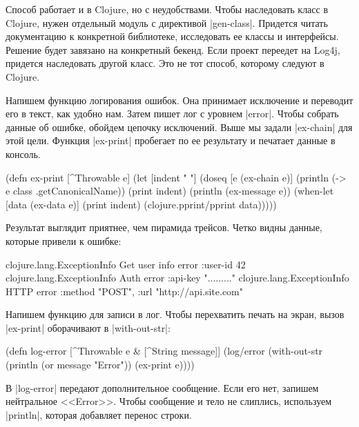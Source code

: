 Способ работает и в Clojure, но с неудобствами. Чтобы наследовать класс в
Clojure, нужен отдельный модуль с директивой \spverb|gen-class|. Придется читать
документацию к конкретной библиотеке, исследовать ее классы и
интерфейсы. Решение будет завязано на конкретный бекенд. Если проект переедет на
Log4j, придется наследовать другой класс. Это не тот способ, которому следуют в
Clojure.

Напишем функцию логирования ошибок. Она принимает исключение и переводит его в
текст, как удобно нам. Затем пишет лог с уровнем \spverb|error|. Чтобы собрать
данные об ошибке, обойдем цепочку исключений. Выше мы задали \spverb|ex-chain|
для этой цели. Функция \spverb|ex-print| пробегает по ее результату и печатает
данные в консоль.

\begin{english}
  \begin{clojure}
(defn ex-print
  [^Throwable e]
  (let [indent "  "]
    (doseq [e (ex-chain e)]
      (println (-> e class .getCanonicalName))
      (print indent)
      (println (ex-message e))
      (when-let [data (ex-data e)]
        (print indent)
        (clojure.pprint/pprint data)))))
  \end{clojure}
\end{english}

Результат выглядит приятнее, чем пирамида трейсов. Четко видны данные, которые
привели к ошибке:

\begin{english}
  \begin{clojure}
clojure.lang.ExceptionInfo
  Get user info error
  {:user-id 42}
clojure.lang.ExceptionInfo
  Auth error
  {:api-key "........."}
clojure.lang.ExceptionInfo
  HTTP error
  {:method "POST", :url "http://api.site.com"}
  \end{clojure}
\end{english}

Напишем функцию для записи в лог. Чтобы перехватить печать на экран, вызов
\spverb|ex-print| оборачивают в \spverb|with-out-str|:

\begin{english}
  \begin{clojure}
(defn log-error
  [^Throwable e & [^String message]]
  (log/error
   (with-out-str
     (println (or message "Error"))
     (ex-print e))))
  \end{clojure}
\end{english}

В \spverb|log-error| передают дополнительное сообщение. Если его нет, запишем
нейтральное <<Error>>. Чтобы сообщение и тело не слиплись, используем
\spverb|println|, которая добавляет перенос строки.

